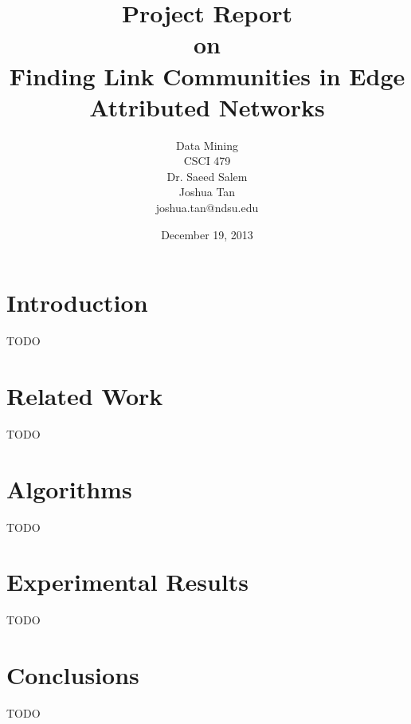 \documentclass[12pt]{report}
\title{Project Report\\[0.5em]{\Large on}\\[0.5em]Finding Link Communities in Edge Attributed Networks}
\author{Data Mining\\CSCI 479\\Dr. Saeed Salem\\[1em] Joshua Tan\\joshua.tan@ndsu.edu}
\date{December 19, 2013}
\begin{document}
\maketitle

\section{Introduction}

TODO

\section{Related Work}

TODO

\section{Algorithms}

TODO

\section{Experimental Results}

TODO

\section{Conclusions}

TODO

\nocite{DBLP:conf/ccs/MazurekKVBCCKSU13}
\nocite{ahn-lehmann-link-communities-nature-2010}
\nocite{Salem:2013:MMF:2500863.2500869}



\end{document}
